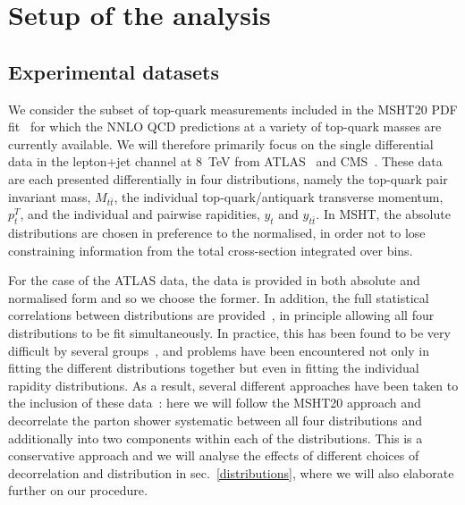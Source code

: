 \documentclass[sn-mathphys]{sn-jnl}%
\newcommand{\pT}{p^T_t}
\newcommand{\mtt}{M_{t\bar{t}}}
\newcommand{\yt}{y_{t}}
\newcommand{\ytt}{y_{t\bar{t}}}
\begin{document}
\section{Setup of the analysis}\label{setup}

\subsection{Experimental datasets} \label{data}
We consider the subset of top-quark measurements included in the MSHT20 PDF fit~\cite{Bailey:2020ooq} for which the NNLO QCD predictions at a variety of top-quark masses are currently available. We will therefore primarily focus on the single differential data in the lepton+jet channel at 8~TeV from ATLAS~\cite{ATLAS:2015lsn} and CMS~\cite{CMS:2015rld}. These data are each presented differentially in four distributions, namely the top-quark pair invariant mass, $\mtt$, the individual top-quark/antiquark transverse momentum, $\pT$, and the individual and pairwise rapidities, $\yt$ and $\ytt$. In MSHT, the absolute distributions are chosen in preference to the normalised, in order not to lose constraining information from the total cross-section integrated over bins.

For the case of the ATLAS data, the data is provided in both absolute and normalised form and so we choose the former. In addition, the full statistical correlations between distributions are provided~\cite{ATLAS:2018owm}, in principle allowing all four distributions to be fit simultaneously. In practice, this has been found to be very difficult by several groups~\cite{Czakon:2016olj,Bailey:2019yze,Thorne:2019mpt,Hou:2019efy,Amat:2019upj,Hou:2019gfw,Bailey:2020ooq,Kadir:2020yml,Amoroso:2020lgh,NNPDF:2021njg}, and problems have been encountered not only in fitting the different distributions together but even in fitting the individual rapidity distributions. As a result, several different approaches have been taken to the inclusion of these data~\cite{Bailey:2019yze,Bailey:2020ooq,ATLAS:2018owm,Hou:2019efy,NNPDF:2021njg}: here we will follow the MSHT20 approach and decorrelate the parton shower systematic between all four distributions and additionally into two components within each of the distributions. This is a conservative approach and we will analyse the effects of different choices of decorrelation and distribution in sec.~\ref{distributions}, where we will also elaborate further on our procedure. 
\end{document}
